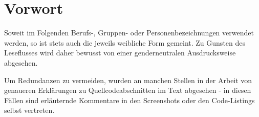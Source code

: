 \documentclass[
	12pt,
	BCOR=10mm,1
	headinclude=on,
	footinclude=off,
	parskip=half,
	bibliography=totoc,
	listof=entryprefix,
	toc=listof, 
	pointlessnumbers,
	plainfootsepline]{scrreprt}
\begin{document}


\normalfont


\chapter*{Vorwort}
Soweit im Folgenden Berufs-, Gruppen- oder Personenbezeichnungen verwendet werden, so ist stets auch die jeweils weibliche Form gemeint. Zu Gunsten des Leseflusses wird daher bewusst von einer genderneutralen Ausdrucksweise abgesehen.
\par
Um Redundanzen zu vermeiden, wurden an manchen Stellen in der Arbeit von genaueren Erklärungen zu Quellcodeabschnitten im Text abgesehen - in diesen Fällen sind erläuternde Kommentare in den Screenshots oder den Code-Listings selbst vertreten.


\tableofcontents





%

\clearpage 
\ihead{\chaptername~\thechapter} %



\ihead{} %
\printbibliography	

\appendix
\ihead{\appendixname~\thechapter} %




\end{document}
